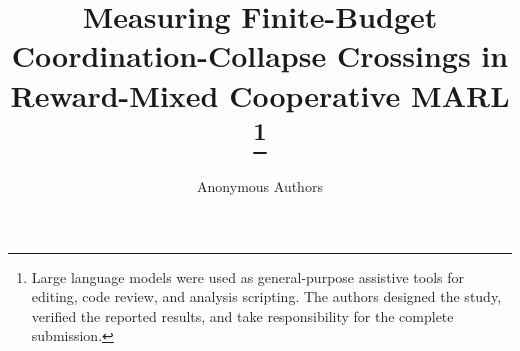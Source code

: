 \documentclass[10pt]{article}
\title{Measuring Finite-Budget Coordination-Collapse Crossings in Reward-Mixed Cooperative MARL%
\thanks{Large language models were used as general-purpose assistive tools for editing, code review, and analysis scripting. The authors designed the study, verified the reported results, and take responsibility for the complete submission.}}
\author{Anonymous Authors}
\begin{document}
\maketitle

\begin{abstract}

\end{abstract}






\clearpage
\appendix

\end{document}
